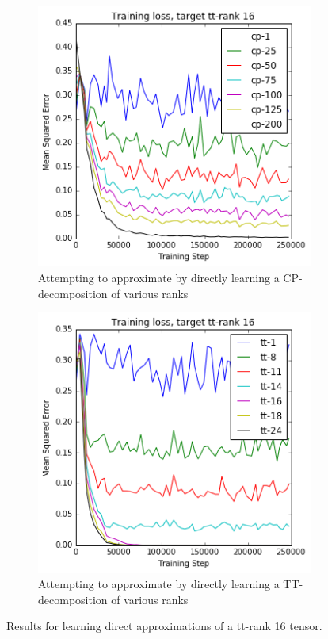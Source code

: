 \begin{figure}[ht]
\centering
\begin{subfigure}[t]{0.45\textwidth}
	\includegraphics[width=\textwidth]{tensors/tt16cpapprox}
	\caption{Attempting to approximate by directly learning a 
		CP-decomposition of various ranks}
	\label{fig:ttcpapprox}
\end{subfigure}
\hfill
\begin{subfigure}[t]{0.45\textwidth}
	\includegraphics[width=\textwidth]{tensors/tt16ttapprox}
	\caption{Attempting to approximate by directly learning a TT-decomposition of various ranks}
	\label{fig:ttttapprox}
\end{subfigure}
\caption{Results for learning direct approximations of a tt-rank 16 tensor.}
\label{fig:ttapprox}
\end{figure}
